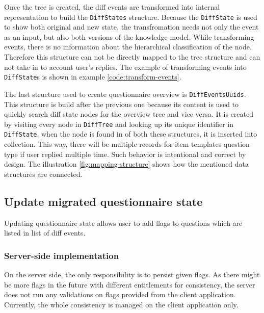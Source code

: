 Once the tree is created, the diff events are transformed into internal representation to build the \texttt{DiffStates} structure.
Because the \texttt{DiffState} is used to show both original and new state, the transfromation needs not only the event as an input, but also both versions of the knowledge model.
While transforming events, there is no information about the hierarchical classification of the node.
Therefore this structure can not be directly mapped to the tree structure and can not take in to account user's replies.
The example of transforming events into \texttt{DiffState}s is shown in example \ref{code:transform-events}.



The last structure used to create questionnaire overview is \texttt{DiffEventsUuids}.
This structure is build after the previous one because its content is used to quickly search diff state nodes for the overview tree and vice versa.
It is created by visiting every node in \texttt{DiffTree} and looking up its unique identifier in \texttt{DiffState}, when the node is found in of both these structures, it is inserted into collection.
This way, there will be multiple records for item templates question type if user replied multiple time.
Such behavior is intentional and correct by design.
The illustration \ref{fig:mapping-structure} shows how the mentioned data structures are connected.


\subsection{Update migrated questionnaire state}

Updating questionnaire state allows user to add flags to questions which are listed in list of diff events.

\subsubsection*{Server-side implementation}

On the server side, the only responsibility is to persist given flags.
As there might be more flags in the future with different entitlements for consistency, the server does not run any validations on flags provided from the client application.
Currently, the whole consistency is managed on the client application only.

